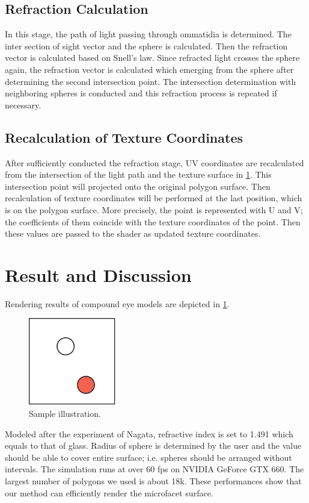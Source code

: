 \subsection{Refraction Calculation}
In this stage, the path of light passing through ommatidia is determined.
The inter section of sight vector and the sphere is calculated.
Then the refraction vector is calculated based on Snell’s law.
Since refracted light crosses the sphere again, the refraction vector is calculated which emerging from the sphere after determining the second intersection point.
The intersection determination with neighboring spheres is conducted and this refraction process is repeated if necessary.

\subsection{Recalculation of Texture Coordinates}
After sufficiently conducted the refraction stage, UV coordinates are recalculated from the intersection of the light path and the texture surface in \ref{}.
This intersection point will projected onto the original polygon surface.
Then recalculation of texture coordinates will be performed at the last position, which is on the polygon surface.
More precisely, the point is represented with U and V; the coefficients of them coincide with the texture coordinates of the point.
Then these values are passed to the shader as updated texture coordinates.

\section{Result and Discussion}

Rendering results of compound eye models are depicted in \ref{}.
\begin{figure}[ht]
  \centering
  \includegraphics[width=1.5in]{images/samplefigure}
  \caption{Sample illustration.}
\end{figure}
Modeled after the experiment of Nagata, refractive index is set to 1.491 which equals to that of glass.
Radius of sphere is determined by the user and the value should be able to cover entire surface; i.e. spheres should be arranged without intervals.
The simulation runs at over 60 fps on NVIDIA GeForce GTX 660.
The largest number of polygons we used is about 18k. These performances show that our method can efficiently render the microfacet surface.


